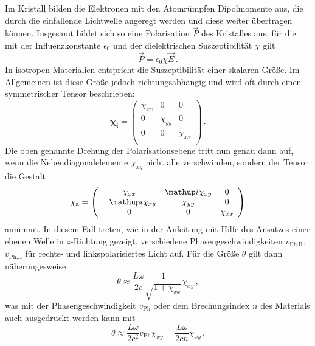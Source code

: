 Im Kristall bilden die Elektronen mit den Atomrümpfen Dipolmomente aus,
die durch die einfallende Lichtwelle angeregt werden und diese weiter
übertragen können.
Insgesamt bildet sich so eine Polarisation $\vec{P}$ des Kristalles aus,
für die mit der Influenzkonstante $\epsilon_0$ und der dielektrischen
Suszeptibilität $\chi$ gilt
\begin{equation}
    \label{eqn:polarisation}
    \vec{P} = \epsilon_0\chi\vec{E}\,.
\end{equation}
In isotropen Materialien entspricht die Suszeptibilität einer skalaren Größe.
Im Allgemeinen ist diese Größe jedoch richtungsabhängig und wird oft
durch einen symmetrischer Tensor beschrieben:
\begin{equation}
    \label{eqn:suszeptibilitaet_inaktiv}
    \mathbf{\chi}_\text{i} =
    \left(\begin{array}{ccc}
        \chi_{xx} & 0 & 0 \\
        0 & \chi_{yy} & 0 \\
        0 & 0 & \chi_{xx} \\
    \end{array}\right)\,.
\end{equation}
Die oben genannte Drehung der Polarisationsebene tritt nun genau dann auf, wenn
die Nebendiagonalelemente $\chi_{xy}$ nicht alle verschwinden, sondern der
Tensor die Gestalt
\begin{equation}
    \label{eqn:suszeptibilitaet_aktiv}
    \mathbf{\chi}_\text{a} =
    \left(\begin{array}{ccc}
        \chi_{xx}    & \i\chi_{xy} & 0 \\
        -\i\chi_{xy} & \chi_{yy}   & 0 \\
        0            & 0           & \chi_{xx} \\
    \end{array}\right)
\end{equation}
annimmt. In diesem Fall treten, wie in der Anleitung \cite{V46} mit Hilfe
des Ansatzes einer ebenen Welle in $z$-Richtung gezeigt, verschiedene
Phasengeschwindigkeiten $v_\text{Ph,R}$, $v_\text{Ph,L}$ für rechts- und
linkspolarisiertes Licht auf.
Für die Größe $\theta$ gilt dann näherungesweise
\begin{equation}
    \label{eqn:theta_cirkular}
    \theta \approx \frac{L\omega}{2c}\frac{1}{\sqrt{1+\chi_{xx}}}\chi_{xy}\,,
\end{equation}
was mit der Phasengeschwindigkeit $v_\text{Ph}$ oder dem Brechungsindex $n$
des Materials auch ausgedrückt werden kann mit
\begin{equation}
    \label{eqn:theta_n}
    \theta
    \approx \frac{L\omega}{2c^2}v_\text{Ph}\chi_{xy}
    = \frac{L\omega}{2cn}\chi_{xy}\,.
\end{equation}

